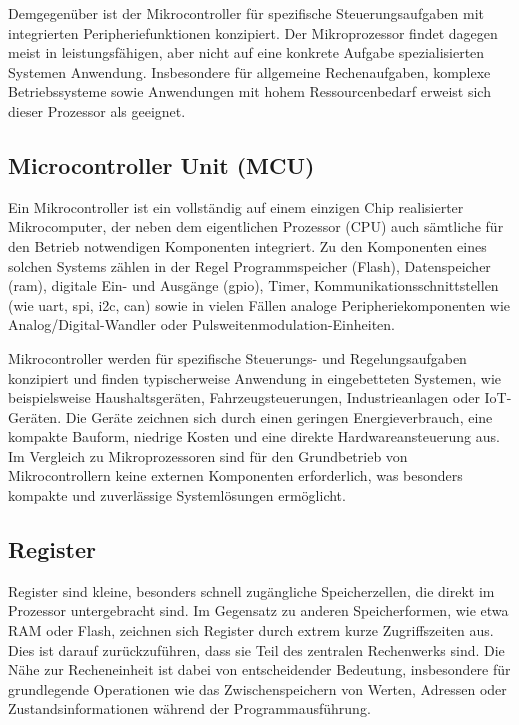 Demgegenüber ist der Mikrocontroller für spezifische Steuerungsaufgaben mit integrierten Peripheriefunktionen konzipiert. 
Der Mikroprozessor findet dagegen meist in leistungsfähigen, aber nicht auf eine konkrete Aufgabe spezialisierten Systemen Anwendung. 
Insbesondere für allgemeine Rechenaufgaben, komplexe Betriebssysteme sowie Anwendungen mit hohem Ressourcenbedarf erweist sich dieser Prozessor als geeignet.

\subsection*{Microcontroller Unit (MCU)}
Ein Mikrocontroller ist ein vollständig auf einem einzigen Chip realisierter Mikrocomputer, der neben dem eigentlichen Prozessor (CPU) auch sämtliche für den Betrieb notwendigen Komponenten integriert. 
Zu den Komponenten eines solchen Systems zählen in der Regel Programmspeicher (Flash), Datenspeicher (\gls{ram}), digitale Ein- und Ausgänge (\gls{gpio}), Timer, Kommunikationsschnittstellen (wie \gls{uart}, \gls{spi}, \gls{i2c}, \gls{can}) sowie in vielen Fällen analoge Peripheriekomponenten wie Analog/Digital-Wandler oder Pulsweitenmodulation-Einheiten.

Mikrocontroller werden für spezifische Steuerungs- und Regelungsaufgaben konzipiert und finden typischerweise Anwendung in eingebetteten Systemen, wie beispielsweise Haushaltsgeräten, Fahrzeugsteuerungen, Industrieanlagen oder IoT-Geräten. 
Die Geräte zeichnen sich durch einen geringen Energieverbrauch, eine kompakte Bauform, niedrige Kosten und eine direkte Hardwareansteuerung aus. 
Im Vergleich zu Mikroprozessoren sind für den Grundbetrieb von Mikrocontrollern keine externen Komponenten erforderlich, was besonders kompakte und zuverlässige Systemlösungen ermöglicht.


%


\subsection*{Register}
Register sind kleine, besonders schnell zugängliche Speicherzellen, die direkt im Prozessor untergebracht sind. 
Im Gegensatz zu anderen Speicherformen, wie etwa RAM oder Flash, zeichnen sich Register durch extrem kurze Zugriffszeiten aus. 
Dies ist darauf zurückzuführen, dass sie Teil des zentralen Rechenwerks sind. 
Die Nähe zur Recheneinheit ist dabei von entscheidender Bedeutung, insbesondere für grundlegende Operationen wie das Zwischenspeichern von Werten, Adressen oder Zustandsinformationen während der Programmausführung.


